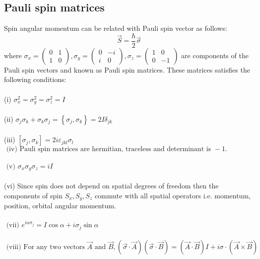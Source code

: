 \subsection{Pauli spin matrices}
Spin angular momentum can be related with Pauli spin vector as follows:
$$
\vec{S}=\frac{\hbar}{2} \vec{\sigma}
$$
where $\sigma_{x}=\left(\begin{array}{ll}0 & 1 \\ 1 & 0\end{array}\right), \sigma_{y}=\left(\begin{array}{cc}0 & -i \\ i & 0\end{array}\right), \sigma_{z}=\left(\begin{array}{cc}1 & 0 \\ 0 & -1\end{array}\right)$ are components of the Pauli spin vectors and known as Pauli spin matrices. These matrices satisfies the following conditions:\\\\
(i) $\sigma_{x}^{2}=\sigma_{y}^{2}=\sigma_{z}^{2}=I$\\\\
(ii) $\sigma_{j} \sigma_{k}+\sigma_{k} \sigma_{j}=\left\{\sigma_{j}, \sigma_{k}\right\}=2 I \delta_{j k}$\\\\
(iii) $\left[\sigma_{j}, \sigma_{k}\right]=2 i \varepsilon_{j k l} \sigma_{l}$\\
$\text { (iv) Pauli spin matrices are hermitian, traceless and determinant is }-1 \text {. }$\\\\
$\text { (v) } \sigma_{x} \sigma_{y} \sigma_{z}=i I$\\\\
(vi) Since spin does not depend on spatial degrees of freedom then the components of spin $S_{x}, S_{y}, S_{z}$ commute with all spatial operators i.e. momentum, position, orbital angular momentum.\\\\
$\text { (vii) } e^{i \alpha \sigma_{j}}=I \cos \alpha+i \sigma_{j} \sin \alpha$\\\\
$\text { (viii) For any two vectors } \vec{A} \text { and } \vec{B},(\vec{\sigma} \cdot \vec{A})(\vec{\sigma} \cdot \vec{B})=(\vec{A} \cdot \vec{B}) I+i \sigma \cdot(\vec{A} \times \vec{B})$\\

